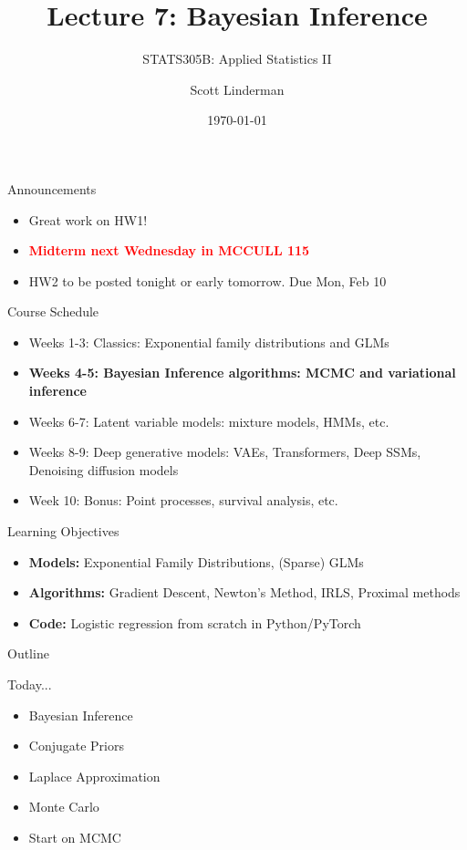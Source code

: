 \documentclass[aspectratio=169]{beamer}
\title{Lecture 7: Bayesian Inference}
\subtitle{STATS305B: Applied  Statistics II}
\author{Scott Linderman}
\date{\today}
\begin{document}
\maketitle

\begin{frame}{Announcements}

    \begin{itemize}
        \item Great work on HW1!
        \item \textcolor{red}{\textbf{Midterm next Wednesday in MCCULL 115}}
        \item HW2 to be posted tonight or early tomorrow. Due Mon, Feb 10
    \end{itemize}
    
\end{frame}

\begin{frame}{Course Schedule}
\begin{itemize}
  \item Weeks 1-3: Classics: Exponential family distributions and GLMs
  \item \textbf{Weeks 4-5: Bayesian Inference algorithms: MCMC and variational inference}
  \item Weeks 6-7: Latent variable models: mixture models, HMMs, etc.
  \item Weeks 8-9: Deep generative models: VAEs, Transformers, Deep SSMs, Denoising diffusion models
  \item Week 10: Bonus: Point processes, survival analysis, etc.
\end{itemize}

\end{frame}

\begin{frame}{Learning Objectives}
  \begin{itemize}
    \item \textbf{Models:} Exponential Family Distributions, (Sparse) GLMs 
    
    \item \textbf{Algorithms:} Gradient Descent, Newton's Method, IRLS, Proximal methods
    
    \item \textbf{Code:} Logistic regression from scratch in Python/PyTorch
  \end{itemize}
\end{frame}
    
\begin{frame}{Outline}

    Today...
    \begin{itemize}
        \item Bayesian Inference
        \item Conjugate Priors
        \item Laplace Approximation
        \item Monte Carlo
        \item Start on MCMC
    \end{itemize}
    
\end{frame}
\end{document}
